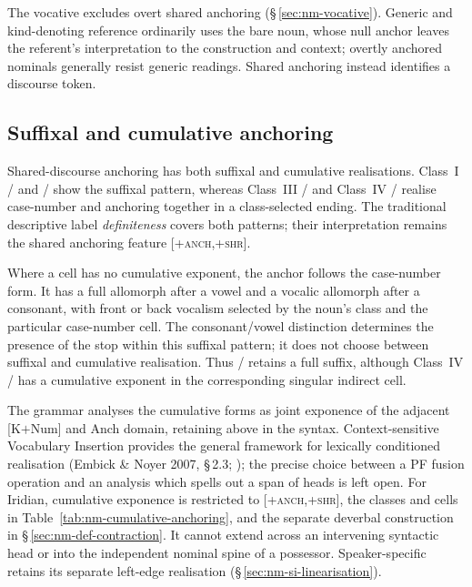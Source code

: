 The vocative excludes overt shared anchoring (§\,\ref{sec:nm-vocative}).
Generic and kind-denoting reference ordinarily uses the bare noun, whose null
anchor leaves the referent's interpretation to the construction and context;
overtly anchored nominals generally resist generic readings. Shared anchoring
instead identifies a discourse token.

\subsection{Suffixal and cumulative anchoring}
\label{sec:nm-def-allomorph}

Shared-discourse anchoring has both suffixal and cumulative realisations.
Class~I / and / show the
suffixal pattern, whereas Class~III / and Class~IV
/ realise case-number and anchoring together in a
class-selected ending. The traditional descriptive label \emph{definiteness}
covers both patterns; their interpretation remains the shared anchoring
feature [\textsc{+anch,+shr}].

Where a cell has no cumulative exponent, the anchor follows the case-number
form. It has a full allomorph  after a vowel and a vocalic
allomorph  after a consonant, with front or back vocalism selected
by the noun's class and the particular case-number cell. The consonant/vowel
distinction determines the presence of the stop within this suffixal pattern;
it does not choose between suffixal and cumulative realisation. Thus
/ retains a full suffix, although Class~IV
/ has a cumulative exponent in the corresponding
singular indirect cell.

The grammar analyses the cumulative forms as joint exponence of the adjacent
[K$+$Num] and Anch domain, retaining  above  in
the syntax. Context-sensitive Vocabulary Insertion provides the general
framework for lexically conditioned realisation (Embick \& Noyer 2007,
§\,2.3; \cite{embicknoyer2007}); the precise choice between a PF fusion
operation and an analysis which spells out a span of heads is left open.
For Iridian, cumulative exponence is restricted to [\textsc{+anch,+shr}],
the classes and cells in Table~\ref{tab:nm-cumulative-anchoring}, and the
separate deverbal construction in §\,\ref{sec:nm-def-contraction}. It cannot
extend across an intervening syntactic head or into the independent nominal
spine of a possessor. Speaker-specific  retains its separate
left-edge realisation (§\,\ref{sec:nm-si-linearisation}).

